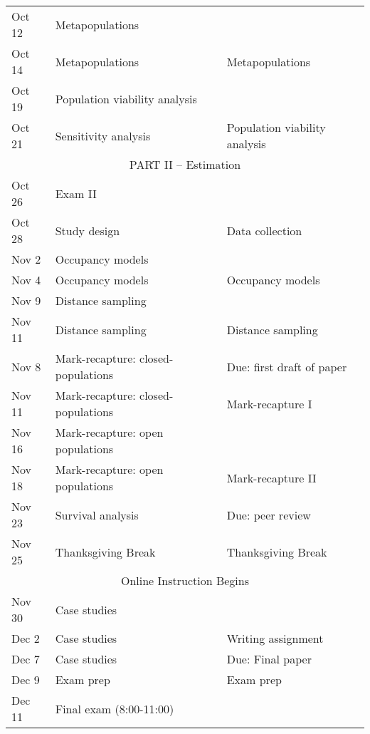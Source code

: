 \documentclass[12pt]{article}
\begin{document}
\begin{center}
\begin{tabular}[c]{lll}
\hline
Oct 12     & Metapopulations                    &                                      \\
Oct 14     & Metapopulations                    & Metapopulations                      \\
\hline
Oct 19     & Population viability analysis      &                                      \\
Oct 21     & Sensitivity analysis               & Population viability analysis        \\
\hline
           \multicolumn{3}{c}{PART II -- Estimation}                                   \\
\hline
Oct 26     & Exam II                            &                                      \\
Oct 28     & Study design                       & Data collection                      \\
\hline
Nov 2      & Occupancy models                   &                                      \\
Nov 4      & Occupancy models                   & Occupancy models                     \\
\hline
Nov 9      & Distance sampling                  &                                      \\
Nov 11     & Distance sampling                  & Distance sampling                    \\
\hline
Nov 8      & Mark-recapture: closed-populations & Due: first draft of paper            \\
Nov 11     & Mark-recapture: closed-populations & Mark-recapture I                     \\
\hline
Nov 16     & Mark-recapture: open populations   &                                      \\
Nov 18     & Mark-recapture: open populations   & Mark-recapture II                    \\
\hline
Nov 23     & Survival analysis                  & Due: peer review                     \\
Nov 25     & Thanksgiving Break                 & Thanksgiving Break                   \\
\hline
           \multicolumn{3}{c}{Online Instruction Begins}                               \\
\hline
Nov 30     & Case studies                       &                                      \\
Dec 2      & Case studies                       & Writing assignment                   \\
\hline
Dec 7      & Case studies                       & Due: Final paper                     \\
Dec 9      & Exam prep                          & Exam prep                            \\
Dec 11     & Final exam (8:00-11:00)            &                                      \\
\hline \hline
\end{tabular}
\end{center}
\end{document}
